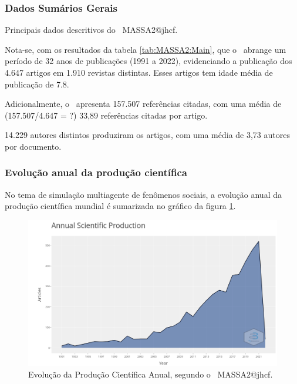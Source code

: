 \subsubsection{Dados Sumários Gerais}

\begin{table}[htp]
    \centering
{}
    \caption{Principais dados descritivos do \dataset\   MASSA2@jhcf.}
    \label{tab:MASSA2:Main}
\end{table}

Nota-se, com os resultados da tabela \ref{tab:MASSA2:Main}, que o \dataset\   abrange um período de 32 anos de publicações (1991 a 2022), evidenciando  a publicação dos 4.647 artigos em 1.910 revistas distintas. Esses artigos tem idade média de publicação de 7.8.

Adicionalmente, o \dataset\ apresenta 157.507 referências citadas, com uma média de (157.507/4.647 = ?) 33,89 referências citadas por artigo.

14.229 autores distintos produziram os artigos, com uma média de 3,73 autores por documento.

\subsubsection{Evolução anual da produção científica}

No tema de simulação multiagente de fenômenos sociais, a evolução anual da produção científica mundial é sumarizada no gráfico da figura \ref{fig:MASSA2:Annual-Scientific-Production}.

\begin{figure}
    \centering
    \includegraphics[width=1\textwidth]{experiments/jhcf/PesqBibliogr/SimulacaoMultiagente/WoS-20220203/Descritiva/MASSA2-Annual-Scientific-Production.png}
    \caption{Evolução da Produção Científica Anual, segundo o \dataset\ MASSA2@jhcf.}
    \label{fig:MASSA2:Annual-Scientific-Production}
\end{figure}

